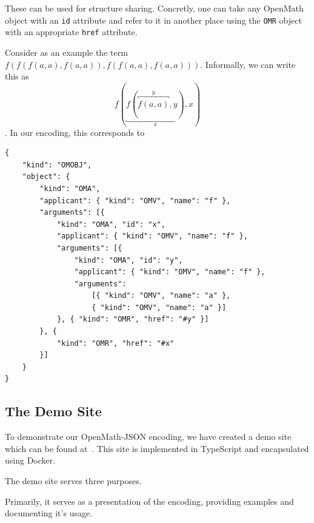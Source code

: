 These can be used for structure sharing. 
Concretly, one can take any OpenMath object with an \texttt{id} attribute and refer to it in another place using the \texttt{OMR} object with an appropriate \texttt{href} attribute. 

Consider as an example the term $f(f(f(a, a), f(a, a)), f(f(a, a), f(a, a)))$. 
Informally, we can write this as $$f(\underbracket {f(\overbracket {f(a, a)}^y, y)}_x, x)$$. 
In our encoding, this corresponds to
\\\begin{minipage}{\linewidth}\begin{lstlisting}
{
    "kind": "OMOBJ",
    "object": {
        "kind": "OMA",
        "applicant": { "kind": "OMV", "name": "f" },
        "arguments": [{ 
            "kind": "OMA", "id": "x",
            "applicant": { "kind": "OMV", "name": "f" },
            "arguments": [{
                "kind": "OMA", "id": "y",
                "applicant": { "kind": "OMV", "name": "f" },
                "arguments": 
                    [{ "kind": "OMV", "name": "a" },
                    { "kind": "OMV", "name": "a" }]
            }, { "kind": "OMR", "href": "#y" }]
        }, {
            "kind": "OMR", "href": "#x" 
        }]
    }
}
\end{lstlisting}\end{minipage}


\subsection{The Demo Site}

To demonstrate our OpenMath-JSON encoding, we have created a demo site which can be found at~\cite{openmathjson:web}. 
This site is implemented in TypeScript and encapsulated using Docker\cite{docker:webpage}. 

The demo site serves three purposes.

Primarily, it serves as a presentation of the encoding, providing examples and documenting it's usage. 

